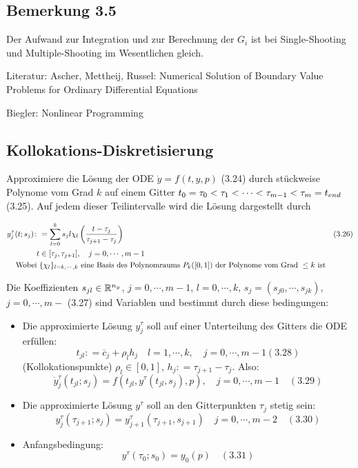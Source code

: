 \subsection*{Bemerkung 3.5}

Der Aufwand zur Integration und zur Berechnung der $G_i$ ist bei Single-Shooting und Multiple-Shooting im Wesentlichen gleich.


Literatur: Ascher, Mettheij, Russel: Numerical Solution of Boundary Value Problems for Ordinary Differential Equations

Biegler: Nonlinear Programming

\subsection*{Kollokations-Diskretisierung}

Approximiere die Lösung der ODE $\dot y = f(t,y,p)$ (3.24) durch stückweise Polynome vom Grad $k$ auf einem Gitter $t_0 = \tau_0 < \tau_1 < \cdots < \tau_{m-1} < \tau_m = t_{end}$ (3.25). Auf jedem dieser Teilintervalle wird die Lösung dargestellt durch

\begin{align*}
y_j^\tau (t; s_j) \colon&= \sum\limits_{l=0}^k s_j l \chi_l \left( \frac{t-\tau_j}{\tau_{j+1}-\tau_j} \right) & (3.26)\\
t &\in [\tau_j, \tau_{j+1}], \quad j=0,\cdots,m-1 \\
\text{Wobei } & \{ \chi_l \}_{l=k,\cdots,k} \text{ eine Basis des Polynomraums } P_k([0,1]) \text{ der Polynome vom Grad } \leq k \text{ ist}
\end{align*}

Die Koeffizienten $s_{jl} \in \mathbb{R}^{n_y}$, $j=0,\cdots,m-1$, $l=0,\cdots,k$, $s_j = (s_{j0},\cdots,s_{jk})$, $j=0,\cdots,m-$ (3.27) sind Variablen und bestimmt durch diese bedingungen:

\begin{itemize}
\item Die approximierte Lösung $y_j^\tau$ soll auf einer Unterteilung des Gitters die ODE erfüllen:
\[ t_{jl} \colon= \overline c_j + \rho_l h_j \quad l= 1,\cdots,k, \quad j=0,\cdots,m-1 (3.28) \]
(Kollokationspunkte) $\rho_l \in [0,1]$, $h_j \colon= \tau_{j+1}-\tau_j$. Also:
\[ \dot y_j^\tau (t_{jl}; s_j) = f(t_{jl}, y^\tau (t_{jl},s_j),p), \quad j=0,\cdots,m-1 \quad (3.29) \]
\item Die approximierte Lösung $y^\tau$ soll an den Gitterpunkten $\tau_j$ stetig sein:
\[ y_j^\tau (\tau_{j+1};s_j) = y_{j+1}^\tau(\tau_{j+1},s_{j+1}) \quad j=0,\cdots,m-2 \quad (3.30) \]
\item Anfangsbedingung:
\[y^\tau(\tau_0;s_0) = y_0(p) \quad (3.31) \]
\end{itemize}

